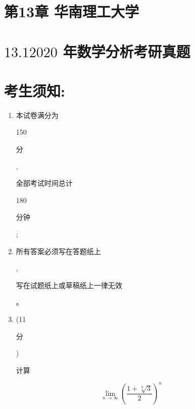 \documentclass[10pt]{article}
\begin{document}
\section{第13章 华南理工大学}
\section{$13.12020$ 年数学分析考研真题}
\section{考生须知:}
\begin{enumerate}
  \item \begin{CJK}{UTF8}{mj}本试卷满分为\end{CJK} 150 \begin{CJK}{UTF8}{mj}分\end{CJK}, \begin{CJK}{UTF8}{mj}全部考试时间总计\end{CJK} 180 \begin{CJK}{UTF8}{mj}分钟\end{CJK};

  \item \begin{CJK}{UTF8}{mj}所有答案必须写在答题纸上\end{CJK}, \begin{CJK}{UTF8}{mj}写在试题纸上或草稿纸上一律无效\end{CJK}。

  \item (11 \begin{CJK}{UTF8}{mj}分\end{CJK}) \begin{CJK}{UTF8}{mj}计算\end{CJK}

\end{enumerate}
$$
\lim _{n \rightarrow \infty}\left(\frac{1+\sqrt[n]{3}}{2}\right)^{n}
$$
\end{document}
